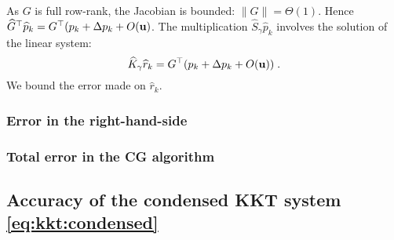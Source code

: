 As $G$ is full row-rank, the Jacobian is bounded: $\|G \| = \Theta(1)$.
Hence $\widehat{G}^\top \widehat{p}_k = G^\top (p_k + \Delta p_k + O(\mathbf{u})$.
The multiplication $\widehat{S}_\gamma \widehat{p}_k$ involves the
solution of the linear system:
\begin{equation}
  \widehat{K}_\gamma \widehat{r}_k = G^\top (p_k + \Delta p_k + O(\mathbf{u})) \; .
\end{equation}
We bound the error made on $\widehat{r}_k$.

\subsubsection{Error in the right-hand-side}


\subsubsection{Total error in the CG algorithm}


\subsection{Accuracy of the condensed KKT system \eqref{eq:kkt:condensed}}
